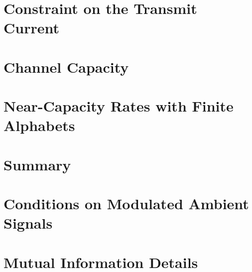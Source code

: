 \documentclass[10pt,conference]{IEEEtran}
\begin{document}
\section{Constraint on the Transmit Current}
\label{sec:constraint}


\section{Channel Capacity}
\label{sec:capacity}


\section{Near-Capacity Rates with Finite Alphabets}
\label{sec:practical}


\section{Summary}
\label{sec:summary}


\begin{appendices}
	
    \section{Conditions on Modulated Ambient Signals}
    \label{apdx:amb}
    

    \section{Mutual Information Details}
    \label{apdx:ar}
    

\end{appendices}




\end{document}
